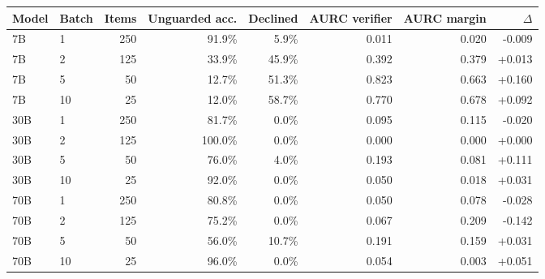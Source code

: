 \begin{tabular}{llrrrrrr}
\toprule
Model & Batch & Items & Unguarded acc. & Declined & AURC verifier & AURC margin & $\Delta$ \\
\midrule
7B & 1 & 250 & 91.9\% & 5.9\% & 0.011 & 0.020 & -0.009 \\
7B & 2 & 125 & 33.9\% & 45.9\% & 0.392 & 0.379 & +0.013 \\
7B & 5 & 50 & 12.7\% & 51.3\% & 0.823 & 0.663 & +0.160 \\
7B & 10 & 25 & 12.0\% & 58.7\% & 0.770 & 0.678 & +0.092 \\
30B & 1 & 250 & 81.7\% & 0.0\% & 0.095 & 0.115 & -0.020 \\
30B & 2 & 125 & 100.0\% & 0.0\% & 0.000 & 0.000 & +0.000 \\
30B & 5 & 50 & 76.0\% & 4.0\% & 0.193 & 0.081 & +0.111 \\
30B & 10 & 25 & 92.0\% & 0.0\% & 0.050 & 0.018 & +0.031 \\
70B & 1 & 250 & 80.8\% & 0.0\% & 0.050 & 0.078 & -0.028 \\
70B & 2 & 125 & 75.2\% & 0.0\% & 0.067 & 0.209 & -0.142 \\
70B & 5 & 50 & 56.0\% & 10.7\% & 0.191 & 0.159 & +0.031 \\
70B & 10 & 25 & 96.0\% & 0.0\% & 0.054 & 0.003 & +0.051 \\
\bottomrule
\end{tabular}
